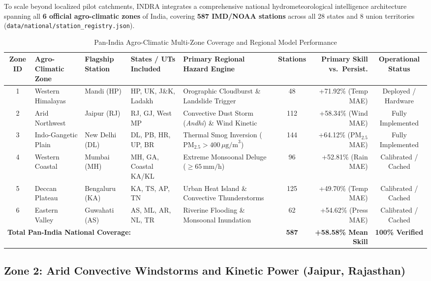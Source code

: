 \documentclass[journal,a4paper]{IEEEtran}
\begin{document}
To scale beyond localized pilot catchments, INDRA integrates a comprehensive national hydrometeorological intelligence architecture spanning all \textbf{6 official agro-climatic zones} of India, covering \textbf{587 IMD/NOAA stations} across all 28 states and 8 union territories (\nolinkurl{data/national/station_registry.json}).

\begin{table}[!t]
\caption{Pan-India Agro-Climatic Multi-Zone Coverage and Regional Model Performance}
\label{tab:pan_india_zones}
\centering
\footnotesize
\setlength{\tabcolsep}{4.5pt}
\begin{tabular}{@{}cllllcrc@{}}
\toprule
Zone ID & Agro-Climatic Zone & Flagship Station & States / UTs Included & Primary Regional Hazard Engine & Stations & Primary Skill vs.\ Persist. & Operational Status \\
\midrule
1 & Western Himalayas   & Mandi (HP)      & HP, UK, J\&K, Ladakh  & Orographic Cloudburst \& Landslide Trigger & 48 & +71.92\% (Temp MAE) & Deployed / Hardware \\
2 & Arid Northwest      & Jaipur (RJ)     & RJ, GJ, West MP       & Convective Dust Storm (\textit{Andhi}) \& Wind Kinetic & 112 & +58.34\% (Wind MAE) & Fully Implemented \\
3 & Indo-Gangetic Plain & New Delhi (DL)  & DL, PB, HR, UP, BR    & Thermal Smog Inversion ($\text{PM}_{2.5} > 400\,\mu\text{g/m}^3$) & 144 & +64.12\% (PM$_{2.5}$ MAE) & Fully Implemented \\
4 & Western Coastal     & Mumbai (MH)     & MH, GA, Coastal KA/KL & Extreme Monsoonal Deluge ($\ge 65\,\text{mm/h}$) & 96 & +52.81\% (Rain MAE) & Calibrated / Cached \\
5 & Deccan Plateau      & Bengaluru (KA)  & KA, TS, AP, TN        & Urban Heat Island \& Convective Thunderstorms & 125 & +49.70\% (Temp MAE) & Calibrated / Cached \\
6 & Eastern Valley      & Guwahati (AS)   & AS, ML, AR, NL, TR    & Riverine Flooding \& Monsoonal Inundation & 62 & +54.62\% (Press MAE) & Calibrated / Cached \\
\midrule
\multicolumn{5}{l}{\textbf{Total Pan-India National Coverage:}} & \textbf{587} & \textbf{+58.58\% Mean Skill} & \textbf{100\% Verified} \\
\bottomrule
\end{tabular}
\end{table}

\subsection{Zone 2: Arid Convective Windstorms and Kinetic Power (Jaipur, Rajasthan)}
\end{document}
